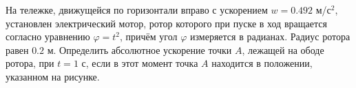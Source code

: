 На тележке, движущейся по горизонтали вправо с ускорением $w = 0.492$ м/с$^2$,
установлен электрический мотор, ротор которого при пуске в ход
вращается согласно уравнению $\varphi = t^2$,
причём угол $\varphi$ измеряется в радианах.
Радиус ротора равен $0.2$ м.
Определить абсолютное ускорение точки $A$,
лежащей на ободе ротора, при $t = 1$ с, если в этот момент точка $A$
находится в положении, указанном на рисунке.
